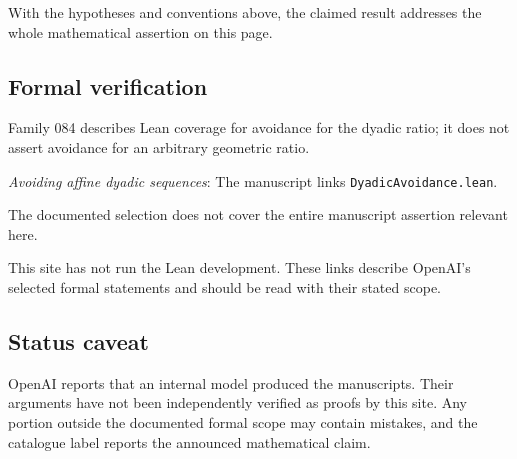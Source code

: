 \documentclass[11pt]{article}
\begin{document}
With the hypotheses and conventions above, the claimed result addresses the whole mathematical assertion on this page.

\subsection{Formal verification}
Family 084 describes Lean coverage for avoidance for the dyadic ratio; it does not assert avoidance for an arbitrary geometric ratio.

\textit{Avoiding affine dyadic sequences}: The manuscript links \texttt{DyadicAvoidance.lean}.

The documented selection does not cover the entire manuscript assertion relevant here.

This site has not run the Lean development. These links describe OpenAI’s selected formal statements and should be read with their stated scope.

\subsection{Status caveat}
OpenAI reports that an internal model produced the manuscripts. Their arguments have not been independently verified as proofs by this site. Any portion outside the documented formal scope may contain mistakes, and the catalogue label reports the announced mathematical claim.
\end{document}
